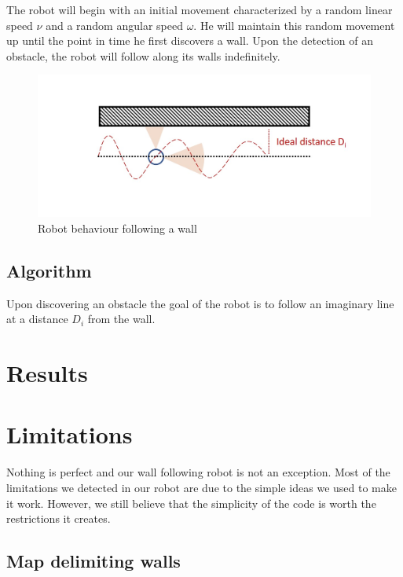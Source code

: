 \documentclass[10pt,journal,compsoc]{IEEEtran}
\begin{document}
The robot will begin with an initial movement characterized by a random linear speed $\nu$ and a random angular speed $\omega$. He will maintain this random movement up until the point in time he first discovers a wall. Upon the detection of an obstacle, the robot will follow along its walls indefinitely.

   \begin{figure}[thpb]
      \centering
     \includegraphics[scale=0.3]{img/behaviour.jpg}
      \caption{Robot behaviour following a wall}
      \label{fig:robot}
   \end{figure}

\subsection{Algorithm}
Upon discovering an obstacle the goal of the robot is to follow an imaginary line at a distance $D_i$ from the wall. 

\section{Results}

\section{Limitations}

Nothing is perfect and our wall following robot is not an exception. Most of the limitations we detected in our robot are due to the simple ideas we used to make it work. However, we still believe that the simplicity of the code is worth the restrictions it creates.

\subsection{Map delimiting walls}
\end{document}
